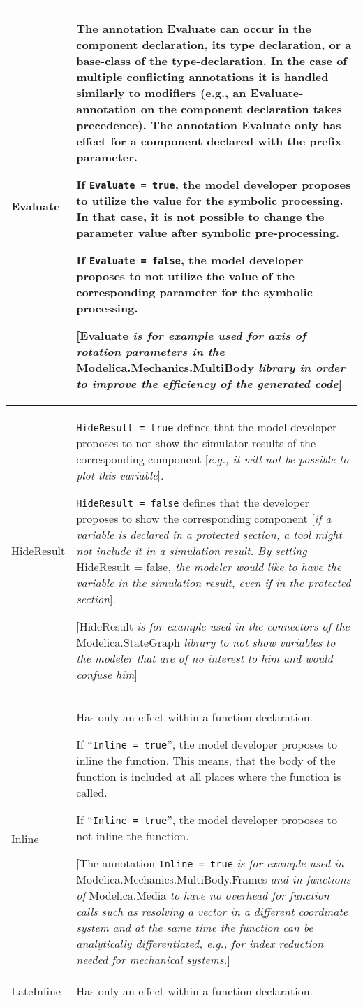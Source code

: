 \begin{longtable}[]{|p{4.2cm}|p{10cm}|}
\hline \endhead
Evaluate&
The annotation Evaluate can occur in the component declaration, its type
declaration, or a base-class of the type-declaration. In the case of
multiple conflicting annotations it is handled similarly to modifiers
(e.g., an Evaluate-annotation on the component declaration takes
precedence). The annotation Evaluate only has effect for a component
declared with the prefix parameter.

If \lstinline!Evaluate = true!, the model developer proposes to utilize the value
for the symbolic processing. In that case, it is not possible to change
the parameter value after symbolic pre-processing.

If \lstinline!Evaluate = false!, the model developer proposes to not utilize the
value of the corresponding parameter for the symbolic processing.

{[}Evaluate \emph{is for example used for axis of rotation parameters in
the} Modelica.Mechanics.MultiBody \emph{library in order to improve the
efficiency of the generated code}{]}\\ \hline
HideResult &
\lstinline!HideResult = true! defines that the model developer proposes to not show
the simulator results of the corresponding component {[}\emph{e.g., it
will not be possible to plot this variable}{]}.

\lstinline!HideResult = false! defines that the developer proposes to show the
corresponding component {[}\emph{if a variable is declared in a
protected section, a tool might not include it in a simulation result.
By setting} HideResult = false\emph{, the modeler would like to have the
variable in the simulation result, even if in the protected section}{]}.

{[}HideResult \emph{is for example used in the connectors of the}
Modelica.StateGraph \emph{library to not show variables to the modeler
that are of no interest to him and would confuse him}{]}\\ \hline
Inline &
Has only an effect within a function declaration.

If ``\lstinline!Inline = true!'', the model developer proposes to inline the
function. This means, that the body of the function is included at all
places where the function is called.

If ``\lstinline!Inline = true!'', the model developer proposes to not inline the
function.

{[}The annotation \lstinline!Inline = true! \emph{is for example used in}
Modelica\allowbreak{}.Mechanics\allowbreak{}.MultiBody\allowbreak{}.Frames \emph{and in functions of}
Modelica\allowbreak{}.Media \emph{to have no overhead for function calls such as
resolving a vector in a different coordinate system and at the same time
the function can be analytically differentiated, e.g., for index
reduction needed for mechanical systems.}{]}\\ \hline
LateInline
&
Has only an effect within a function declaration.


\end{longtable}
